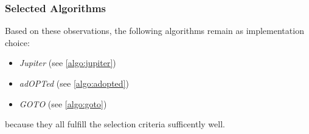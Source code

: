 \subsubsection{Selected Algorithms}
Based on these observations, the following algorithms remain as implementation choice:

\begin{itemize}
 \item \emph{Jupiter} (see \ref{algo:jupiter})
 \item \emph{adOPTed} (see \ref{algo:adopted})
 \item \emph{GOTO} (see \ref{algo:goto})
\end{itemize}

because they all fulfill the selection criteria sufficently well.

